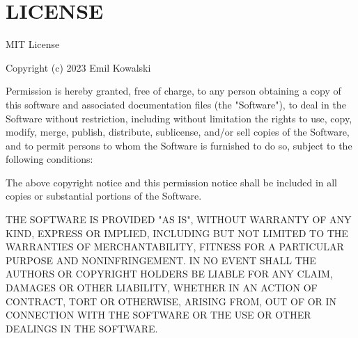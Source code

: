 \chapter{LICENSE }
\hypertarget{md_frontend_2node__modules_2sonner_2LICENSE}{}\label{md_frontend_2node__modules_2sonner_2LICENSE}
MIT License

Copyright (c) 2023 Emil Kowalski

Permission is hereby granted, free of charge, to any person obtaining a copy of this software and associated documentation files (the "{}\+Software"{}), to deal in the Software without restriction, including without limitation the rights to use, copy, modify, merge, publish, distribute, sublicense, and/\+or sell copies of the Software, and to permit persons to whom the Software is furnished to do so, subject to the following conditions:\+

The above copyright notice and this permission notice shall be included in all copies or substantial portions of the Software.

THE SOFTWARE IS PROVIDED "{}\+AS IS"{}, WITHOUT WARRANTY OF ANY KIND, EXPRESS OR IMPLIED, INCLUDING BUT NOT LIMITED TO THE WARRANTIES OF MERCHANTABILITY, FITNESS FOR A PARTICULAR PURPOSE AND NONINFRINGEMENT. IN NO EVENT SHALL THE AUTHORS OR COPYRIGHT HOLDERS BE LIABLE FOR ANY CLAIM, DAMAGES OR OTHER LIABILITY, WHETHER IN AN ACTION OF CONTRACT, TORT OR OTHERWISE, ARISING FROM, OUT OF OR IN CONNECTION WITH THE SOFTWARE OR THE USE OR OTHER DEALINGS IN THE SOFTWARE. 